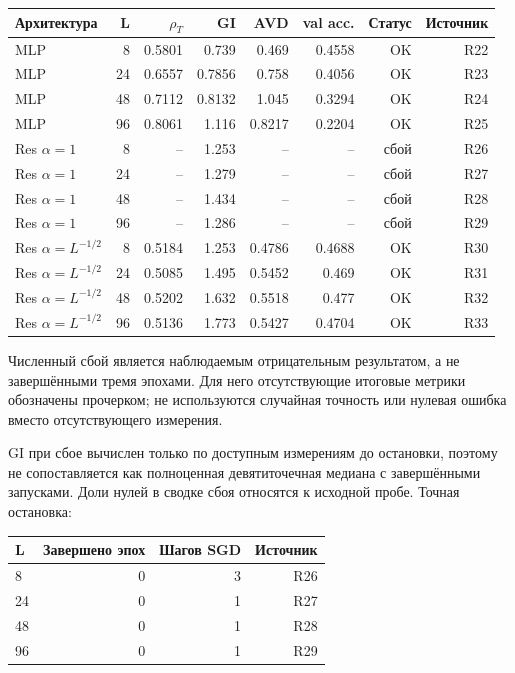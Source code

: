 \documentclass[10pt,a4paper]{article}
\begin{document}
\begin{center}\small
\begin{tabular}{lrrrrrrr}
\toprule
Архитектура & L & $\rho_T$ & GI & AVD & val acc. & Статус & Источник \\
\midrule
MLP & 8 & 0.5801 & 0.739 & 0.469 & 0.4558 & OK & R22 \\
MLP & 24 & 0.6557 & 0.7856 & 0.758 & 0.4056 & OK & R23 \\
MLP & 48 & 0.7112 & 0.8132 & 1.045 & 0.3294 & OK & R24 \\
MLP & 96 & 0.8061 & 1.116 & 0.8217 & 0.2204 & OK & R25 \\
Res $\alpha=1$ & 8 & -- & 1.253 & -- & -- & сбой & R26 \\
Res $\alpha=1$ & 24 & -- & 1.279 & -- & -- & сбой & R27 \\
Res $\alpha=1$ & 48 & -- & 1.434 & -- & -- & сбой & R28 \\
Res $\alpha=1$ & 96 & -- & 1.286 & -- & -- & сбой & R29 \\
Res $\alpha=L^{-1/2}$ & 8 & 0.5184 & 1.253 & 0.4786 & 0.4688 & OK & R30 \\
Res $\alpha=L^{-1/2}$ & 24 & 0.5085 & 1.495 & 0.5452 & 0.469 & OK & R31 \\
Res $\alpha=L^{-1/2}$ & 48 & 0.5202 & 1.632 & 0.5518 & 0.477 & OK & R32 \\
Res $\alpha=L^{-1/2}$ & 96 & 0.5136 & 1.773 & 0.5427 & 0.4704 & OK & R33 \\
\bottomrule
\end{tabular}\end{center}

Численный сбой является наблюдаемым отрицательным результатом, а не завершёнными тремя эпохами. Для него отсутствующие итоговые метрики обозначены прочерком; не используются случайная точность или нулевая ошибка вместо отсутствующего измерения.

GI при сбое вычислен только по доступным измерениям до остановки, поэтому не сопоставляется как полноценная девятиточечная медиана с завершёнными запусками. Доли нулей в сводке сбоя относятся к исходной пробе. Точная остановка:

\begin{center}\small
\begin{tabular}{lrrr}
\toprule
L & Завершено эпох & Шагов SGD & Источник \\
\midrule
8 & 0 & 3 & R26 \\
24 & 0 & 1 & R27 \\
48 & 0 & 1 & R28 \\
96 & 0 & 1 & R29 \\
\bottomrule
\end{tabular}\end{center}
\end{document}
